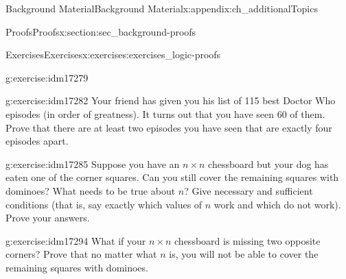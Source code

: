\documentclass[oneside,10pt,]{book}
\numberwithin{equation}{chapter}
\begin{document}
\begin{appendixptx}{Background Material}{}{Background Material}{}{}{x:appendix:ch_additionalTopics}
\begin{sectionptx}{Proofs}{}{Proofs}{}{}{x:section:sec_background-proofs}
\begin{exercises-subsection}{Exercises}{}{Exercises}{}{}{x:exercises:exercises_logic-proofs}
\begin{divisionexercise}{17}{}{}{g:exercise:idm17279}
\end{divisionexercise}%
\begin{divisionexercise}{18}{}{}{g:exercise:idm17282}%
Your friend has given you his list of 115 best Doctor Who episodes (in order of greatness).  It turns out that you have seen 60 of them.  Prove that there are at least two episodes you have seen that are exactly four episodes apart.%
\end{divisionexercise}%
\begin{divisionexercise}{19}{}{}{g:exercise:idm17285}%
Suppose you have an \(n\times n\) chessboard but your dog has eaten one of the corner squares. Can you still cover the remaining squares with dominoes? What needs to be true about \(n\)? Give necessary and sufficient conditions (that is, say exactly which values of \(n\) work and which do not work). Prove your answers.%
\begin{sidebyside}{1}{0.4}{0.4}{0}%
\begin{sbspanel}{0.2}%
%
\end{sbspanel}%
\end{sidebyside}%
\end{divisionexercise}%
\begin{divisionexercise}{20}{}{}{g:exercise:idm17294}%
What if your \(n\times n\) chessboard is missing two opposite corners? Prove that no matter what \(n\) is, you will not be able to cover the remaining squares with dominoes.%
\begin{sidebyside}{1}{0.4}{0.4}{0}%
\begin{sbspanel}{0.2}%
%
\end{sbspanel}%

\end{sidebyside}
\end{divisionexercise}
\end{exercises-subsection}
\end{sectionptx}
\end{appendixptx}
\end{document}
